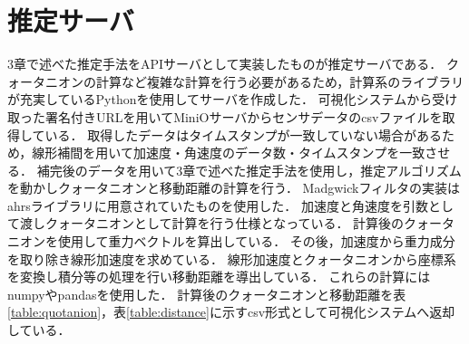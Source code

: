 \section{推定サーバ}
3章で述べた推定手法をAPIサーバとして実装したものが推定サーバである．
クォータニオンの計算など複雑な計算を行う必要があるため，計算系のライブラリが充実しているPythonを使用してサーバを作成した．
可視化システムから受け取った署名付きURLを用いてMiniOサーバからセンサデータのcsvファイルを取得している．
取得したデータはタイムスタンプが一致していない場合があるため，線形補間を用いて加速度・角速度のデータ数・タイムスタンプを一致させる．
補完後のデータを用いて3章で述べた推定手法を使用し，推定アルゴリズムを動かしクォータニオンと移動距離の計算を行う．
Madgwickフィルタの実装はahrsライブラリに用意されていたものを使用した．
加速度と角速度を引数として渡しクォータニオンとして計算を行う仕様となっている．
計算後のクォータニオンを使用して重力ベクトルを算出している．
その後，加速度から重力成分を取り除き線形加速度を求めている．
線形加速度とクォータニオンから座標系を変換し積分等の処理を行い移動距離を導出している．
これらの計算にはnumpyやpandasを使用した．
計算後のクォータニオンと移動距離を表\ref{table:quotanion}，表\ref{table:distance}に示すcsv形式として可視化システムへ返却している．
\begin{table}[ht]
    \centering
    \caption{クォータニオンデータの形式の例}
    \label{table:quotanion}
\end{table}
\begin{table}[ht]
    \centering
    \caption{移動データの形式の例}
    \label{table:distance}
\end{table}
